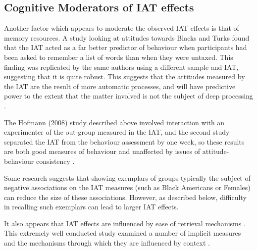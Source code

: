\subsection{Cognitive Moderators of IAT effects}
\label{sec:cogn-moder-iat}



Another factor which appears to moderate the observed IAT effects is that of memory resources. A study looking at attitudes towards Blacks and Turks \cite{Hofmann2008a} found that the IAT acted as a far better predictor of behaviour when participants had been asked to remember a list of words than when they were untaxed. This finding was replicated by the same authors using a different sample and IAT, suggesting that it is quite robust.  This suggests that the attitudes measured by the IAT are the result of more automatic processes, and will have predictive power to the extent that the matter involved is not the subject of deep processing \cite{Kahneman2002}. 

The Hofmann (2008) study described above involved interaction with an experimenter of the out-group measured in the IAT, and the second study separated the IAT from the behaviour assessment by one week, so these results are both good measures of behaviour and unaffected by  issues of attitude-behaviour consistency . 


Some research \cite{Dasgupta2001} suggests that showing exemplars of groups typically the subject of negative associations on the IAT measures (such as Black Americans or Females) can reduce the size of these associations. However, as described below, difficulty in recalling such exemplars can lead to larger IAT effects. 

It also appears that IAT effects are influenced by ease of retrieval mechanisms \cite{Kahneman2002} . This extremely well conducted study examined a number of implicit measures and the mechanisms through which they are influenced by context \cite{Gawronski2005}. 

